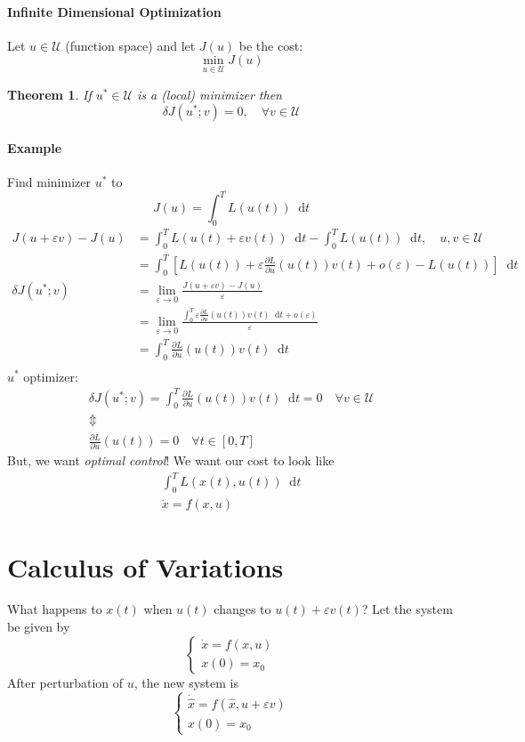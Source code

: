 \documentclass[letterpaper,12pt,titlepage]{report}
\newcommand*\dif{\mathop{}\!\mathrm{d}}
\newcommand*\pder[2]{\frac{\partial #1}{\partial #2}}
\theoremstyle{plain}
\newtheorem*{thm}{Theorem}
\theoremstyle{definition}
\begin{document}
\paragraph{Infinite Dimensional Optimization}
Let $u\in\mathcal U$ (function space) and let $J(u)$ be the cost:
\[ \min_{u\in\mathcal U} J(u) \]

\begin{thm}
  If $u^*\in\mathcal U$ is a (local) minimizer then
  \[ \delta J(u^*;v) = 0, \quad \forall v\in\mathcal U \]
\end{thm}

\paragraph{Example} Find minimizer $u^*$ to
\[ J(u) = \int_0^T L(u(t)) \dif t \]
\begin{align}
  J(u+\varepsilon v) - J(u) &= \int_0^T L(u(t)+\varepsilon v(t)) \dif t - \int_0^T L(u(t)) \dif t, \quad u,v\in\mathcal U \\
                            &= \int_0^T \left[ L(u(t)) + \varepsilon \pder{L}{u}(u(t)) v(t) + o(\varepsilon) - L(u(t)) \right] \dif t \\
  \delta J(u^*;v) &= \lim_{\varepsilon\to0} \frac{J(u+\varepsilon v)-J(u)}{\varepsilon} \\
                            &= \lim_{\varepsilon\to0} \frac{\int_0^T \varepsilon \pder{L}{u}(u(t)) v(t) \dif t + o(\varepsilon)}{\varepsilon} \\
                            &= \int_0^T \pder{L}{u}(u(t)) v(t) \dif t \\
\end{align}
$u^*$ optimizer:
\begin{gather}
  \delta J(u^*;v) = \int_0^T \pder{L}{u}(u(t)) v(t) \dif t = 0 \quad \forall v\in\mathcal U \\
  \Updownarrow \\
  \pder{L}{u} (u(t)) = 0 \quad \forall t\in[0,T]
\end{gather}
But, we want \emph{optimal control}! We want our cost to look like
\begin{gather}
  \int_0^T L(x(t),u(t)) \dif t \\
  \dot x = f(x,u)
\end{gather}

\section{Calculus of Variations}
What happens to $x(t)$ when $u(t)$ changes to $u(t)+\varepsilon v(t)$? Let the system be given by
\[ \begin{cases}
    \dot x = f(x,u) \\
    x(0) = x_0
  \end{cases} \]
After perturbation of $u$, the new system is
\[ \begin{cases}
    \dot{\hat x} = f(\hat x,u+\varepsilon v) \\
    x(0) = x_0
  \end{cases} \]
\end{document}
